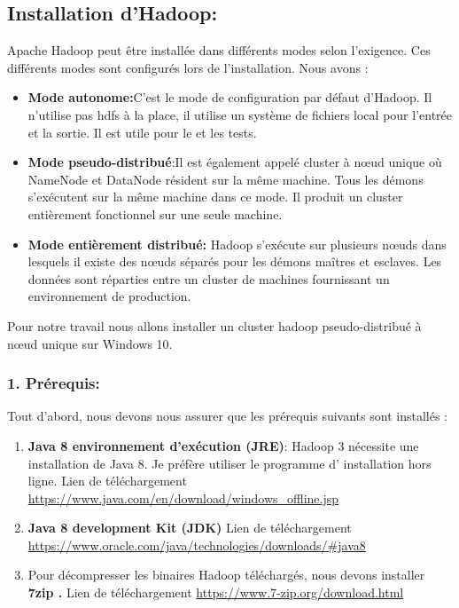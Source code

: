 \subsection{Installation d'Hadoop:}
Apache Hadoop peut être installée dans différents modes selon l'exigence. Ces différents modes sont configurés lors de l'installation. Nous avons :

\begin{itemize}[label=\textbullet]
\item \textbf{Mode autonome:}C'est le mode de configuration par défaut d'Hadoop. Il n'utilise pas hdfs à la place, il utilise un système de fichiers local pour l'entrée et la sortie. Il est utile pour le  et les tests.
\item \textbf{ Mode pseudo-distribué}:Il est également appelé cluster à nœud unique où NameNode et DataNode résident sur la même machine. Tous les démons s'exécutent sur la même machine dans ce mode. Il produit un cluster entièrement fonctionnel sur une seule machine.
\item \textbf{Mode entièrement distribué:} Hadoop s'exécute sur plusieurs nœuds dans lesquels il existe des nœuds séparés pour les démons maîtres et esclaves. Les données sont réparties entre un cluster de machines fournissant un environnement de production.
\end{itemize}

Pour notre travail nous allons installer un cluster hadoop pseudo-distribué à nœud unique sur Windows 10.

\subsubsection{1. Prérequis:}
Tout d'abord, nous devons nous assurer que les prérequis suivants sont installés :

\begin{enumerate}
\item \textbf{Java 8 environnement d'exécution (JRE)}: Hadoop 3 nécessite une installation de Java 8. Je préfère utiliser le programme d' installation hors ligne. Lien de téléchargement \url{https://www.java.com/en/download/windows_offline.jsp}

\item \textbf{Java 8 development Kit (JDK)} Lien de téléchargement \url{https://www.oracle.com/java/technologies/downloads/#java8}

\item Pour décompresser les binaires Hadoop téléchargés, nous devons installer \textbf{7zip .} Lien de téléchargement \url{https://www.7-zip.org/download.html}
\end{enumerate}

